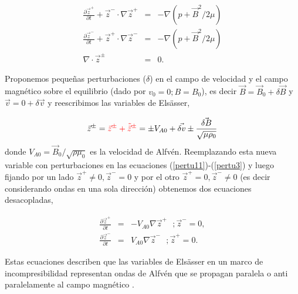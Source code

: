 \documentclass[a4paper,11pt]{report}
\begin{document}
\begin{eqnarray}
  \frac{\partial \vec{z}^+}{\partial t}+ \vec{z}^- \cdot \nabla \vec{z}^+ &=& -\nabla(p + \vec{B}^2/2\mu) \label{pertu11} \\
  \frac{\partial \vec{z}^-}{\partial t}+ \vec{z}^+ \cdot \nabla \vec{z}^- &=& -\nabla(p + \vec{B}^2/2\mu)\\
  \nabla \cdot \vec{z}^\pm &=& 0. \label{pertu3}
\end{eqnarray}

Proponemos pequeñas perturbaciones ($\delta$) en el campo de velocidad y el campo magnético sobre el equilibrio (dado por $v_0 = 0; B=B_0$), es decir $\vec{B} = \vec{B}_0 + \delta \vec{B}$ y $\vec{v} = 0 + \delta \vec{v}$ y reescribimos las variables de Elsässer,

\begin{equation}
  \vec{z}^\pm = \textcolor{red}{\vec{z}^\pm + \tilde{\vec{z}}^\pm} = \pm V_{A0} + \vec{\delta v} \pm \frac{\vec{\delta B}}{\sqrt{\mu \rho_0}}
\end{equation}
donde $V_{A0} = \vec{B}_0/\sqrt{\rho \mu_0}$ es la velocidad de Alfvén.
Reemplazando esta nueva variable con perturbaciones en las ecuaciones (\ref{pertu11})-(\ref{pertu3}) y luego fijando por un lado $\vec{z}^+ \neq 0 ,\vec{z}^- =0$ y por el otro $\vec{z}^+ =0 ,\vec{z}^- \neq 0$ (es decir considerando ondas en una sola dirección) obtenemos dos ecuaciones desacopladas,

\begin{eqnarray}
  \frac{\partial \vec{z}^+}{\partial t} &=& - V_{A0}\nabla \vec{z}^+ \, \, \, \, ;\vec{z}^- = 0,\\
  \frac{\partial \vec{z}^-}{\partial t} &=&  V_{A0}\nabla \vec{z}^- \, \, \, \, ;\vec{z}^+ = 0.
\end{eqnarray}

Estas ecuaciones describen que las variables de Elsässer en un marco de incompresibilidad representan ondas de Alfvén que se propagan paralela o anti paralelamente al campo magnético \citep{magyar_2019}. %
\end{document}
